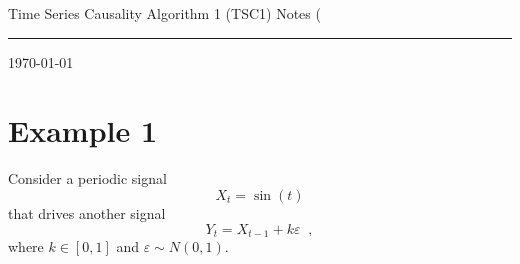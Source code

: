 \documentclass[a4paper,11pt]{article}
\begin{document}
{\Huge Time Series Causality Algorithm 1 (TSC1) Notes}
(
\hfill\rule{150mm}{.1pt}

\hfill{\small \today}

\section{Example 1}
Consider a periodic signal
$$
X_t = \sin{\left(t\right)}
$$
that drives another signal
$$
Y_t = X_{t-1} + k\varepsilon\;\;,
$$
where $k\in[0,1]$ and $\varepsilon\sim N(0,1)$.
\end{document}
